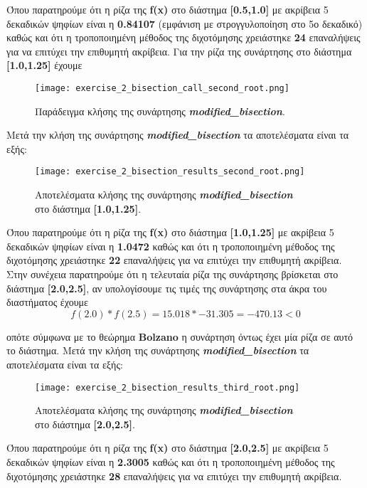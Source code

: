 \documentclass[First Project.tex]{subfiles}
\begin{document}
Όπου παρατηρούμε ότι η ρίζα της \textlatin{\textbf{f(x)}} στο διάστημα \textbf{[0.5,1.0]} με ακρίβεια 5 δεκαδικών ψηφίων 
είναι η \textbf{0.84107} (εμφάνιση με στρογγυλοποίηση στο 5ο δεκαδικό) καθώς και ότι η τροποποιημένη μέθοδος της διχοτόμησης χρειάστηκε \textbf{24} επαναλήψεις για να επιτύχει την 
επιθυμητή ακρίβεια. Για την ρίζα της συνάρτησης στο διάστημα \textbf{[1.0,1.25]} έχουμε 
\vspace{5px}
\begin{figure}[h!]
    \centering
    \captionsetup{justification=centering}
    \begin{center}
        \texttt{[image: exercise\_2\_bisection\_call\_second\_root.png]}    
        \caption{Παράδειγμα κλήσης της συνάρτησης \textit{\textlatin{\textbf{modified\_bisection}}}.}
    \end{center}
\end{figure}


Μετά την κλήση της συνάρτησης \textit{\textlatin{\textbf{modified\_bisection}}} τα αποτελέσματα είναι τα εξής:
\vspace{5px}
\begin{figure}[h!]
    \centering
    \captionsetup{justification=centering}
    \begin{center}
    \texttt{[image: exercise\_2\_bisection\_results\_second\_root.png]}    
    \caption{ Αποτελέσματα κλήσης της συνάρτησης \textit{\textlatin{\textbf{modified\_bisection}}} \\ στο διάστημα \textbf{[1.0,1.25]}.}
    \end{center}
\end{figure}

Όπου παρατηρούμε ότι η ρίζα της \textlatin{\textbf{f(x)}} στο διάστημα \textbf{[1.0,1.25]} με ακρίβεια 5 δεκαδικών ψηφίων 
είναι η \textbf{1.0472} καθώς και ότι η τροποποιημένη μέθοδος της διχοτόμησης χρειάστηκε \textbf{22} επαναλήψεις για να επιτύχει την 
επιθυμητή ακρίβεια. Στην συνέχεια παρατηρούμε ότι η τελευταία ρίζα της συνάρτησης βρίσκεται στο διάστημα \textbf{[2.0,2.5]}, αν υπολογίσουμε
τις τιμές της συνάρτησης στα άκρα του διαστήματος έχουμε 
\begin{equation*}
    f(2.0) * f(2.5) = 15.018 * -31.305 = -470.13 < 0
\end{equation*} 

οπότε σύμφωνα με το θεώρημα \textlatin{\textbf{Bolzano}} η συνάρτηση όντως έχει μία ρίζα σε αυτό το διάστημα.
Μετά την κλήση της συνάρτησης \textit{\textlatin{\textbf{modified\_bisection}}} τα αποτελέσματα είναι τα εξής:
\vspace{5px}
\begin{figure}[h!]
    \centering
    \captionsetup{justification=centering}
    \begin{center}
    \texttt{[image: exercise\_2\_bisection\_results\_third\_root.png]}    
    \caption{ Αποτελέσματα κλήσης της συνάρτησης \textit{\textlatin{\textbf{modified\_bisection}}} \\ στο διάστημα \textbf{[2.0,2.5]}.}
    \end{center}
\end{figure}

Όπου παρατηρούμε ότι η ρίζα της \textlatin{\textbf{f(x)}} στο διάστημα \textbf{[2.0,2.5]} με ακρίβεια 5 δεκαδικών ψηφίων 
είναι η \textbf{2.3005} καθώς και ότι η τροποποιημένη μέθοδος της διχοτόμησης χρειάστηκε \textbf{28} επαναλήψεις για να επιτύχει την 
επιθυμητή ακρίβεια.
\end{document}
